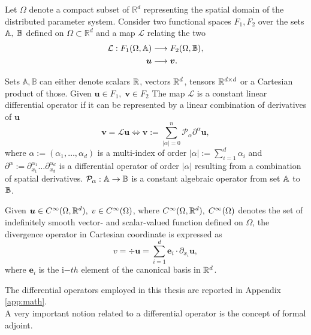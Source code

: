 Let $\Omega$ denote a compact subset of $\mathbb{R}^d$ representing the spatial domain of the distributed parameter system. Consider two functional spaces $F_1, F_2$ over the sets $\mathbb{A}, \; \mathbb{B}$ defined on $\Omega \subset \mathbb{R}^d$ and a map $\mathcal{L}$ relating the two
\begin{equation}
	\begin{aligned}
	\mathcal{L}: F_1(\Omega, \mathbb{A}) &\longrightarrow F_2(\Omega, \mathbb{B}), \\
			     \bm{u} &\longrightarrow \bm{v}.
	\end{aligned}
\end{equation}

Sets $\mathbb{A}, \mathbb{B}$ can either denote  scalars $\mathbb{R}$, vectors $\mathbb{R}^d$,  tensors $\mathbb{R}^{d \times d}$ or a Cartesian product of those. Given $\bm{u} \in F_1, \;  \bm{v} \in F_2$ The map $\mathcal{L}$ is a constant linear differential operator if it can be represented by a linear combination of derivatives of $\bm{u}$
\begin{equation}
\bm{v} = \mathcal{L} \bm{u} \iff \bm{v} := \sum_{|\alpha|=0}^n  \mathcal{P}_{\alpha} \partial^{\alpha} \bm{u},
\end{equation}
where $\alpha := (\alpha_1, \dots , \alpha_d)$ is a multi-index of order $|\alpha| := \sum_{i=1}^d \alpha_i$ and $\partial^{\alpha} := \partial_{x_1}^{\alpha_1} \dots \partial_{x_d}^{\alpha_d}$ is a differential operator of order $|\alpha|$ resulting from a combination of spatial derivatives. $\mathcal{P}_\alpha: \mathbb{A} \rightarrow \mathbb{B}$ is a constant algebraic operator from set $\mathbb{A}$ to $\mathbb{B}$. 

\begin{example}
	Given $\bm{u} \in C^\infty(\Omega, \mathbb{R}^d), \; v \in C^\infty(\Omega)$, where $C^\infty(\Omega, \mathbb{R}^d), \; C^\infty(\Omega)$ denotes the set of indefinitely smooth vector- and scalar-valued function defined on $\Omega$, the divergence operator in Cartesian coordinate is expressed as
	\begin{equation}
	v = \div \bm{u} = \sum_{i = 1}^d \bm{e}_i \cdot \partial_{x_i} \bm{u},
	\end{equation}
	where $\bm{e}_i$ is the i$-th$ element of the canonical basis in $\mathbb{R}^d$. 
\end{example}

The differential operators employed in this thesis are reported in Appendix \ref{app:math}. \\
A very important notion related to a differential operator is the concept of formal adjoint. 

